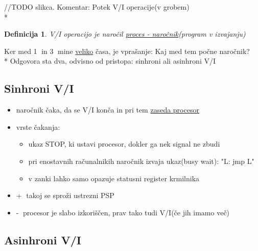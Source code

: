 \documentclass[
  slovene,
  a4paper
]{book}
\newtheorem*{df}{Definicija}
\begin{document}
//TODO slikca. Komentar: Potek V/I operacije(v grobem)\\*

\begin{df}
  V/I operacijo je naročil \underline{proces - naročnik}(program v izvajanju)
\end{df}
Ker med \textcircled{1} in \textcircled{3} mine \underline{veliko} časa, je vprašanje: Kaj med tem počne naročnik?\\*
Odgovora sta dva, odvisno od pristopa: sinhroni ali asinhroni V/I

\subsection{Sinhroni V/I}

\begin{itemize}
  \item naročnik čaka, da se V/I konča in pri tem \underline{zaseda procesor}
  \item vrste čakanja:
    \begin{itemize}
      \item ukaz STOP, ki ustavi procesor, dokler ga nek signal ne zbudi
      \item pri enostavnih računalnikih naročnik izvaja ukaz(busy wait): "L: jmp L"
      \item v zanki lahko samo opazuje statusni register krmilnika
    \end{itemize}
  \item \textcircled{+} takoj se sproži ustrezni PSP
  \item \textcircled{-} procesor je slabo izkoriščen, prav tako tudi V/I(če jih imamo več)
\end{itemize}

\subsection{Asinhroni V/I}
\end{document}
